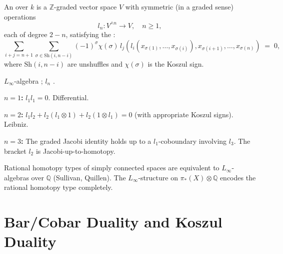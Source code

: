 \begin{definition}
\label{def:Linf-algebra}
An  over $k$ is a $\mathbb{Z}$-graded vector
space $V$ with symmetric (in a graded sense) operations
\begin{equation*}
  l_n : V^{\wedge n} \to V, \quad n \geq 1,
\end{equation*}
each of degree $2 - n$, satisfying the :
\begin{equation*}
  \sum_{i + j = n + 1} \sum_{\sigma \in \mathrm{Sh}(i, n - i)} (-1)^\sigma \chi(\sigma) \, l_j(l_i(x_{\sigma(1)}, \ldots, x_{\sigma(i)}), x_{\sigma(i + 1)}, \ldots, x_{\sigma(n)}) \;=\; 0,
\end{equation*}
where $\mathrm{Sh}(i, n - i)$ are unshuffles and $\chi(\sigma)$ is the
Koszul sign.
\end{definition}

\begin{howtosay}
$L_\infty$-algebra ; $l_n$ .
\end{howtosay}

\begin{example_thm}
\label{ex:linf-low}
\textbf{$n = 1$:} $l_1 l_1 = 0$. Differential.

\textbf{$n = 2$:} $l_1 l_2 + l_2(l_1 \otimes 1) + l_2(1 \otimes l_1) = 0$ (with appropriate Koszul signs).
Leibniz.

\textbf{$n = 3$:} The graded Jacobi identity holds up to a $l_1$-coboundary
involving $l_3$. The bracket $l_2$ is Jacobi-up-to-homotopy.
\end{example_thm}

\begin{theorem}
\label{thm:Linf-rht}
Rational homotopy types of simply connected spaces are equivalent to
$L_\infty$-algebras over $\mathbb{Q}$ (Sullivan, Quillen). The
$L_\infty$-structure on $\pi_*(X) \otimes \mathbb{Q}$ encodes the
rational homotopy type completely.
\end{theorem}


\section{Bar/Cobar Duality and Koszul Duality}
\label{sec:bar-cobar-koszul}


